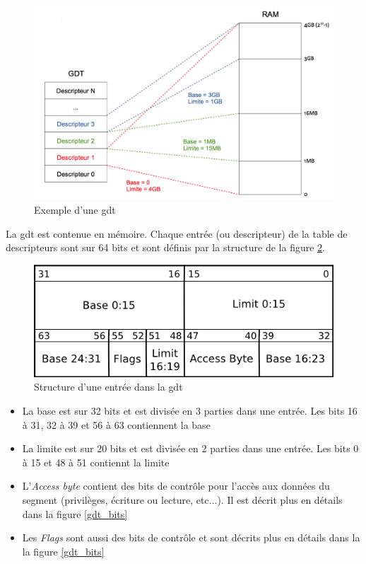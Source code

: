 \documentclass[a4paper]{article}
\begin{document}
\begin{figure}[!h]
  \centering
  \includegraphics[scale=0.75]{images/gdt.png}
  \caption{Exemple d'une \acrshort{gdt}}
  \label{gdt}
\end{figure}

La \acrshort{gdt} est contenue en mémoire. Chaque entrée (ou descripteur) de
la table de descripteurs sont sur 64 bits et sont définis par la structure de
la figure \ref{gdt_entry}.

\begin{figure}[!h]
  \centering
  \includegraphics[scale=0.75]{images/gdt_entry.png}
  \caption{Structure d'une entrée dans la \acrshort{gdt}}
  \label{gdt_entry}
\end{figure}

\begin{itemize}[label=\textbullet]
	\item La base est sur 32 bits et est divisée en 3 parties dans une entrée.
    Les bits 16 à 31, 32 à 39 et 56 à 63 contiennent la base
	\item La limite est sur 20 bits et est divisée en 2 parties dans une entrée.
    Les bits 0 à 15 et 48 à 51 contiennt la limite
	\item L'\textit{Access byte} contient des bits de contrôle pour l'accès aux données
    du segment (privilèges, écriture ou lecture, etc...). Il est décrit plus en détails
    dans la figure \ref{gdt_bits}
    \item Les \textit{Flags} sont aussi des bits de contrôle et sont décrits plus
    en détails dans la la figure \ref{gdt_bits}
\end{itemize}
\end{document}
